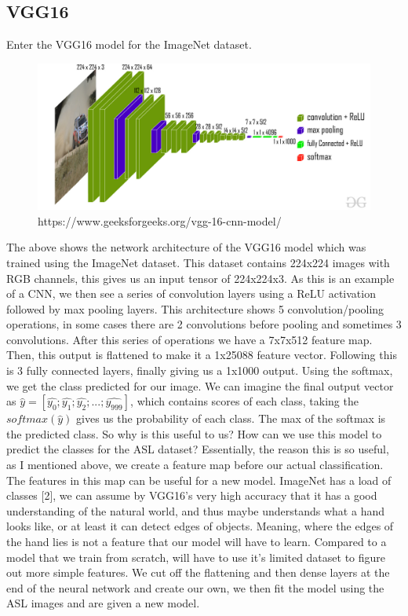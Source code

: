 \documentclass[12pt]{article}
\begin{document}
\subsection{VGG16}
Enter the VGG16 model for the ImageNet dataset. \\
\begin{figure}[H]
    \centering
    \includegraphics[scale=0.25]{images/vgg-architechture.jpg}\\
    https://www.geeksforgeeks.org/vgg-16-cnn-model/
\end{figure}
The above shows the network architecture of the VGG16 model which was trained using the ImageNet dataset. This dataset contains 224x224 images with RGB channels, this gives us an input tensor of 224x224x3.
As this is an example of a CNN, we then see a series of convolution layers using a ReLU activation followed by max pooling layers. This architecture shows 5 convolution/pooling operations, in some cases there are 2 convolutions before 
pooling and sometimes 3 convolutions. After this series of operations we have a 7x7x512 feature map. Then, this output is flattened to make it a 1x25088 feature vector. Following this is 3 
fully connected layers, finally giving us a 1x1000 output. Using the softmax, we get the class predicted for our image. We can imagine the final output vector as $\hat{y} = [\hat{y_0}; \hat{y_1}; \hat{y_2}; ... ; \hat{y_{999}}]$, which contains scores
of each class, taking the $softmax(\hat{y})$ gives us the probability of each class. The max of the softmax is the predicted class. So why is this useful to us? How can we use this model to predict
the classes for the ASL dataset? Essentially, the reason this is so useful, as I mentioned above, we create a feature map before our actual classification. The features in this map can be useful for a new model. ImageNet has a load of classes [2], we can assume by VGG16's very high accuracy that it has a good understanding of the natural world, and thus maybe understands what a hand looks like, or at least it can detect edges of objects. Meaning,
where the edges of the hand lies is not a feature that our model will have to learn. Compared to a model that we train from scratch, will have to use it's limited dataset to figure out more simple features. We cut off
the flattening and then dense layers at the end of the neural network and create our own, we then fit the model using the ASL images and are given a new model. \\
\end{document}
